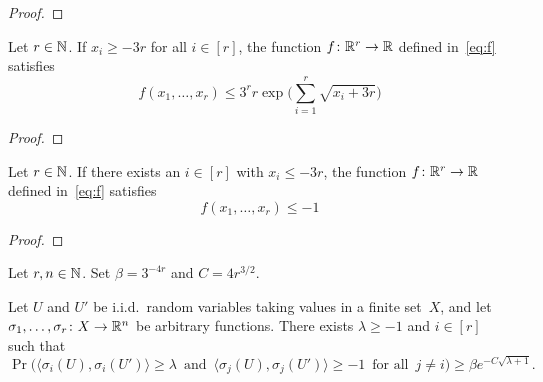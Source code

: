 \begin{proof}
\end{proof}


\begin{lemma}
  \label{lem:special-function-e}
  Let $r \in \mathbb{N}$. If $x_i \ge - 3r$ for all $i \in [r]$, the function $f \colon \mathbb{R}^r \rightarrow \mathbb{R}$ defined in~\eqref{eq:f} satisfies 
  $$ f(x_1,\dots,x_r) \le 3^r r \exp\bigg( \displaystyle\sum_{i = 1}^r \sqrt{ x_i + 3r } \bigg)$$
\end{lemma}
\begin{proof}
\end{proof}


\begin{lemma}
  \label{lem:special-function-ec}
  Let $r \in \mathbb{N}$. If there exists an $i \in [r]$ with $x_i \le - 3r$, the function $f \colon \mathbb{R}^r \rightarrow \mathbb{R}$ defined in~\eqref{eq:f} satisfies
  $$
  f(x_1,\dots,x_r) \le -1$$
\end{lemma}

\begin{proof}
\end{proof}



\begin{lemma}
  \label{lem:geometric}
  Let $r, n\in\mathbb{N}$. Set $\beta = 3^{-4r}$ and $C = 4r^{3/2}$.

  Let\/ $U$ and\/ $U'$ be i.i.d.~random variables taking values in a finite set~$X$, and let $\sigma_1,\ldots,\sigma_r \colon X \rightarrow \mathbb{R}^n$ be arbitrary functions. There exists $\lambda\ge-1$ and\/ $i\in[r]$ such that
  $$\Pr\Big( \big\langle \sigma_i(U),\sigma_i(U') \big\rangle \ge \lambda \, \text{ and } \, \big\langle \sigma_j(U), \sigma_j(U') \big\rangle \ge -1 \, \text{ for all } \, j \ne i \Big) \ge \beta e^{- C\sqrt{\lambda + 1}}.$$
\end{lemma}

